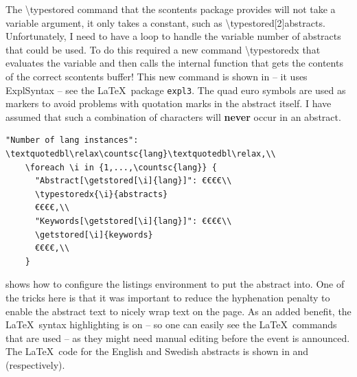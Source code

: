 The \textbackslash typestored command that the scontents package provides will not take a variable argument, \ie it only takes a constant, such as \textbackslash typestored[2]{abstracts}. Unfortunately, I need to have a loop to handle the variable number of abstracts that could be used. To do this required a new command \textbackslash typestoredx that evaluates the variable and then calls the internal function that gets the contents of the correct scontents buffer! This new command is shown in  – it uses ExplSyntax – see the \LaTeX~package \texttt{expl3}. The quad euro symbols are used as markers to avoid problems with quotation marks in the abstract itself. I have assumed that such a combination of characters will \textbf{never} occur in an abstract.
\begin{lstlisting}[language={[LaTeX]TeX}, caption={Code in \textbackslash divainfo command to output the abstracts and keywords }, label=lst:languages] 
    "Number of lang instances": \textquotedbl\relax\countsc{lang}\textquotedbl\relax,\\
    \foreach \i in {1,...,\countsc{lang}} {
      "Abstract[\getstored[\i]{lang}]": €€€€\\
      \typestoredx{\i}{abstracts}
      €€€€,\\
      "Keywords[\getstored[\i]{lang}]": €€€€\\
      \getstored[\i]{keywords}
      €€€€,\\
    }
\end{lstlisting}

 shows how to configure the listings environment to put the abstract into. One of the tricks here is that it was important to reduce the hyphenation penalty to enable the abstract text to nicely wrap text on the page. As an added benefit, the \LaTeX~syntax highlighting is on – so one can easily see the \LaTeX~commands that are used – as they might need manual editing before the event is announced. The \LaTeX~code for the English and Swedish abstracts is shown in  and  (respectively).

